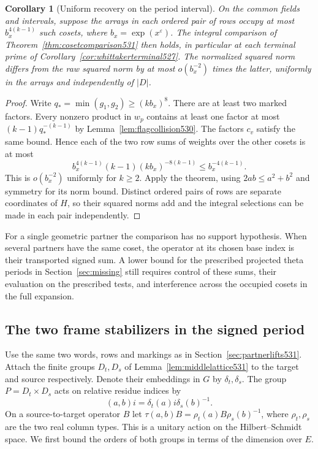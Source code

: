 \documentclass[a4paper,11pt]{article}
\newtheorem{corollary}[proposition]{Corollary}
\theoremstyle{definition}
\theoremstyle{remark}
\numberwithin{equation}{section}
\begin{document}
\begin{corollary}[Uniform recovery on the period interval]
\leavevmode\label{cor:partnerinterval531}
On the common fields and intervals, suppose the arrays in each
ordered pair of rows occupy at most \(b_x^{4(k-1)}\) such cosets,
where \(b_x=\exp(x^\varepsilon)\). The integral comparison of
Theorem~\ref{thm:cosetcomparison531} then holds, in particular
at each terminal prime of Corollary~\ref{cor:whittakerterminal527}.
The normalized squared norm differs from the raw squared norm
by at most \(o(b_x^{-2})\) times the latter, uniformly in the
arrays and independently of \(|D|\).
\end{corollary}
\begin{proof}
Write \(q_*=\min(g_1,g_2)\ge(kb_x)^8\). There are at least
two marked factors. Every nonzero product in \(w_p\) contains
at least one factor at most \((k-1)q_*^{-(k-1)}\) by
Lemma~\ref{lem:flagcollision530}. The factors \(c_v\) satisfy
the same bound. Hence each of the two row sums of weights over
the other cosets is at most
\[
       b_x^{4(k-1)}(k-1)(kb_x)^{-8(k-1)}
            \le b_x^{-4(k-1)} .
\]
This is \(o(b_x^{-2})\) uniformly for \(k\ge2\). Apply the
theorem, using \(2ab\le a^2+b^2\) and symmetry for its norm
bound. Distinct ordered pairs of rows are separate coordinates
of \(H\), so their squared norms add and the integral selections
can be made in each pair independently.
\end{proof}

For a single geometric partner the comparison has no support
hypothesis. When several partners have the same coset, the operator
at its chosen base index is their transported signed sum. A
lower bound for the prescribed projected theta periods in
Section~\ref{sec:missing} still requires control of these sums,
their evaluation on the prescribed tests, and interference across
the occupied cosets in the full expansion.


\subsection{The two frame stabilizers in the signed period}
\label{sec:twostabilizers532}

Use the same two words, rows and markings as in
Section~\ref{sec:partnerlifts531}. Attach the finite groups
\(D_t,D_s\) of Lemma~\ref{lem:middlelattice531} to the target
and source respectively. Denote their embeddings in \(G\) by
\(\delta_t,\delta_s\). The group \(P=D_t\times D_s\) acts on
relative residue indices by
\[
            (a,b)i=\delta_t(a)i\delta_s(b)^{-1}.
\]
On a source-to-target operator \(B\) let
\(\tau(a,b)B=\rho_t(a)B\rho_s(b)^{-1}\), where \(\rho_t,\rho_s\)
are the two real column types. This is a unitary action on the
Hilbert--Schmidt space. We first bound the orders of both groups
in terms of the dimension over \(E\).
\end{document}
